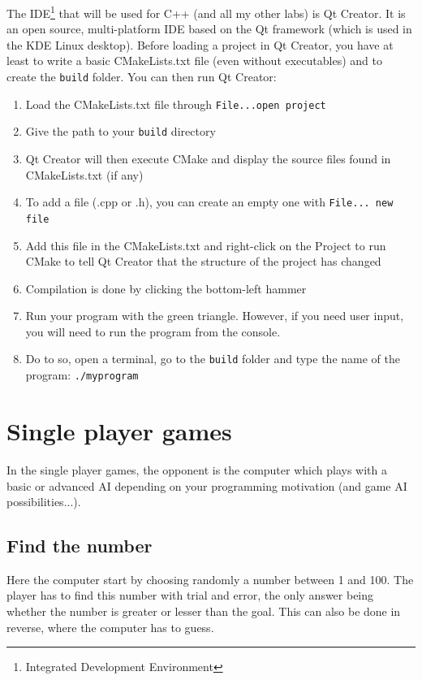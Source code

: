 \documentclass{ecnreport}
\begin{document}
The IDE\footnote{Integrated Development Environment} that will be used for C++ (and all my other labs) is Qt Creator. It is an open source, multi-platform IDE based on the Qt framework (which is used in the KDE Linux desktop). 
Before loading a project in Qt Creator, you have at least to write a basic CMakeLists.txt file (even without executables) and to create the \texttt{build} folder. You can then run Qt Creator:
\begin{enumerate}
\item Load the CMakeLists.txt file through \texttt{File...open project}
\item Give the path to your \texttt{build} directory
\item Qt Creator will then execute CMake and display the source files found in CMakeLists.txt (if any)
\item To add a file (.cpp or .h), you can create an empty one with \texttt{File... new file} 
\item Add this file in the CMakeLists.txt and right-click on the Project to run CMake to tell Qt Creator that the structure of the project has changed
\item Compilation is done by clicking the bottom-left hammer
\item Run your program with the green triangle. However, if you need user input, you will need to run the program from the console.
\item Do to so, open a terminal, go to the \texttt{build} folder and type the name of the program: \texttt{./myprogram}
\end{enumerate}


\section{Single player games}

In the single player games, the opponent is the computer which plays with a basic or advanced AI depending on your programming
motivation (and game AI possibilities...).


\subsection{Find the number}

Here the computer start by choosing randomly a number between 1 and 100. The player has to find this number with trial and error, the only answer being whether the number is greater or lesser than the goal.
This can also be done in reverse, where the computer has to guess.
\end{document}
